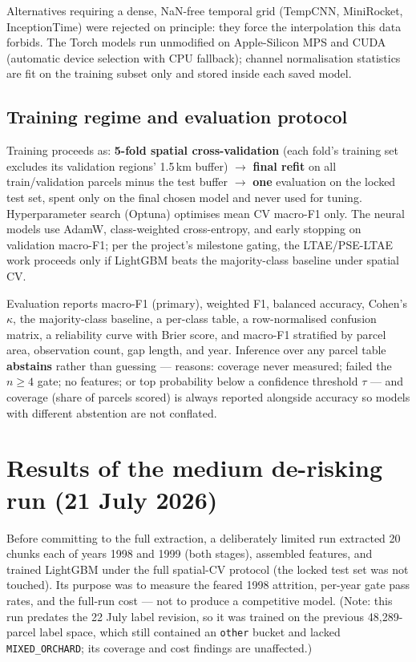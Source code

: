 \documentclass[11pt,a4paper]{article}
\begin{document}
Alternatives requiring a dense, NaN-free temporal grid (TempCNN, MiniRocket, InceptionTime)
were rejected on principle: they force the interpolation this data forbids. The Torch models
run unmodified on Apple-Silicon MPS and CUDA (automatic device selection with CPU fallback);
channel normalisation statistics are fit on the training subset only and stored inside each
saved model.

\subsection{Training regime and evaluation protocol}
\label{sec:regime}

Training proceeds as: \textbf{5-fold spatial cross-validation} (each fold's training set
excludes its validation regions' 1.5\,km buffer) $\to$ \textbf{final refit} on all
train/validation parcels minus the test buffer $\to$ \textbf{one} evaluation on the locked test
set, spent only on the final chosen model and never used for tuning. Hyperparameter search
(Optuna) optimises mean CV macro-F1 only. The neural models use AdamW, class-weighted
cross-entropy, and early stopping on validation macro-F1; per the project's milestone gating,
the LTAE/PSE-LTAE work proceeds only if LightGBM beats the majority-class baseline under
spatial CV.

Evaluation reports macro-F1 (primary), weighted F1, balanced accuracy, Cohen's $\kappa$, the
majority-class baseline, a per-class table, a row-normalised confusion matrix, a reliability
curve with Brier score, and macro-F1 stratified by parcel area, observation count, gap length,
and year. Inference over any parcel table \textbf{abstains} rather than guessing --- reasons:
coverage never measured; failed the $n\geq4$ gate; no features; or top probability below a
confidence threshold $\tau$ --- and coverage (share of parcels scored) is always reported
alongside accuracy so models with different abstention are not conflated.

\section{Results of the medium de-risking run (21 July 2026)}
\label{sec:medium}

Before committing to the full extraction, a deliberately limited run extracted 20 chunks each
of years 1998 and 1999 (both stages), assembled features, and trained LightGBM under the full
spatial-CV protocol (the locked test set was not touched). Its purpose was to measure the
feared 1998 attrition, per-year gate pass rates, and the full-run cost --- not to produce a
competitive model. (Note: this run predates the 22 July label revision, so it was trained on
the previous 48{,}289-parcel label space, which still contained an \texttt{other} bucket and
lacked \texttt{MIXED\_ORCHARD}; its coverage and cost findings are unaffected.)
\end{document}
